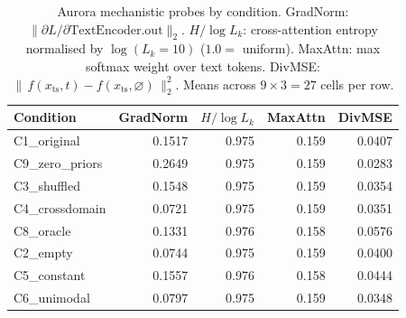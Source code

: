 \begin{table}[t]
\caption{Aurora mechanistic probes by condition. GradNorm: $\|\partial L/\partial \mathrm{TextEncoder.out}\|_2$. $H/\log L_k$: cross-attention entropy normalised by $\log(L_k=10)$ ($1.0 = $ uniform). MaxAttn: max softmax weight over text tokens. DivMSE: $\|\,f(x_{\text{ts}}, t)-f(x_{\text{ts}},\varnothing)\,\|_2^2$. Means across $9 \times 3 = 27$ cells per row.}
\label{tab:probes}
\centering
\small
\begin{tabular}{lrrrr}
\toprule
Condition & GradNorm & $H/\log L_k$ & MaxAttn & DivMSE \\
\midrule
C1\_original & 0.1517 & 0.975 & 0.159 & 0.0407 \\
C9\_zero\_priors & 0.2649 & 0.975 & 0.159 & 0.0283 \\
C3\_shuffled & 0.1548 & 0.975 & 0.159 & 0.0354 \\
C4\_crossdomain & 0.0721 & 0.975 & 0.159 & 0.0351 \\
C8\_oracle & 0.1331 & 0.976 & 0.158 & 0.0576 \\
C2\_empty & 0.0744 & 0.975 & 0.159 & 0.0400 \\
C5\_constant & 0.1557 & 0.976 & 0.158 & 0.0444 \\
C6\_unimodal & 0.0797 & 0.975 & 0.159 & 0.0348 \\
\bottomrule
\end{tabular}
\end{table}